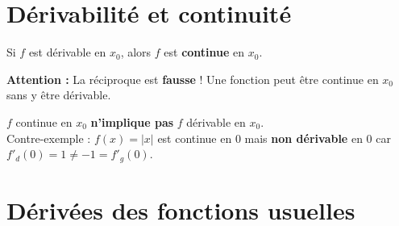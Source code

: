 \section{D\'{e}rivabilit\'{e} et continuit\'{e}}

\begin{theoreme}
  Si $f$ est d\'{e}rivable en $x_0$, alors $f$ est \textbf{continue} en $x_0$.

  \medskip
  \textbf{Attention :} La r\'{e}ciproque est \textbf{fausse} !
  Une fonction peut \^{e}tre continue en $x_0$ sans y \^{e}tre d\'{e}rivable.
\end{theoreme}

\begin{attention}
  $f$ continue en $x_0$ \textbf{n'implique pas} $f$ d\'{e}rivable en $x_0$.\\[4pt]
  Contre-exemple : $f(x) = |x|$ est continue en $0$ mais \textbf{non d\'{e}rivable} en $0$
  car $f'_d(0) = 1 \neq -1 = f'_g(0)$.
\end{attention}

\newpage
\section{D\'{e}riv\'{e}es des fonctions usuelles}

